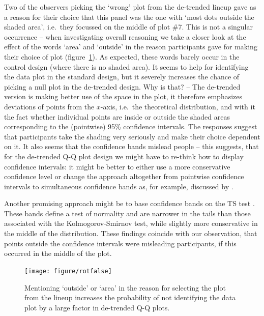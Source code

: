 \documentclass{article}\usepackage[]{graphicx}\usepackage[]{color}
\newenvironment{knitrout}{}{} %
\newcommand{\hh}[1]{{\color{magenta} #1}}
\newcommand{\alnote}[1]{\todo[inline,color=green!40]{#1}}
\newcommand{\hhnote}[1]{\todo[inline,color=magenta!40]{#1}}
\begin{document}
\hh{Two of the observers picking the `wrong' plot from the de-trended lineup gave as a reason for their choice that this panel was the one with `most dots outside the shaded area', i.e.~they focussed on the middle of plot \#7. This is not a singular occurrence -- when investigating  overall reasoning we take a closer look at the effect of the  words `area' and `outside' in the reason participants gave for making their choice of plot (figure~\ref{fig:rotfalse}). As expected, these words barely occur in the control design (where there is no shaded area). It seems to help for identifying the data plot in the standard design, but it severely  increases the chance of picking a null plot in the de-trended design. Why is that? -- The de-trended version is making better use of the space in the plot, it therefore  emphasizes deviations of points from the $x$-axis, i.e.~the theoretical distribution, and with it  the fact whether individual points are inside or outside the shaded areas corresponding to the (pointwise) 95\% confidence intervals. The responses suggest that participants take the shading very seriously and make their choice dependent on it. It also seems that the confidence bands mislead people -- this suggests, that for the de-trended Q-Q plot design we might have to re-think how to display confidence intervals: it might be better to  either use  a more conservative  confidence level or change the approach altogether from pointwise confidence intervals to simultaneous confidence bands as, for example, discussed by \citet{Rosenkrantz:2000fd}.}

\hh{Another promising approach might be to base confidence bands on the TS test \citep{buja:2013}. These bands define a test of normality and are narrower in the tails than those associated with the Kolmogorov-Smirnov test, while slightly more conservative in the middle of the distribution. These findings coincide with our observation, that points  outside the confidence intervals were misleading participants, if this occurred in the middle of the plot.
}


\begin{figure}[hbt]
\centering
\begin{knitrout}
\color{fgcolor}
\texttt{[image: figure/rotfalse]} 

\end{knitrout}
\caption{\label{fig:rotfalse}Mentioning `outside' or `area' in the reason for selecting the plot from the lineup increases the probability of not identifying the data plot by a large factor in de-trended Q-Q plots. }
\end{figure}
\end{document}
